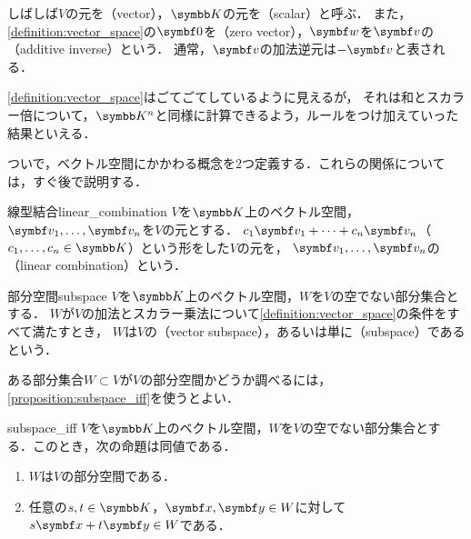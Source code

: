 \documentclass[../../main]{subfiles}
\begin{document}
しばしば\(V\)の元を（vector），\(\numset{K}\)の元を（scalar）と呼ぶ．
また，\cref{definition:vector_space}の\(\zvec\)を（zero vector），\(\vect{w}\)を\(\vect{v}\)の（additive inverse）という．
通常，\(\vect{v}\)の加法逆元は\(-\vect{v}\)と表される．

\begin{note}
  \cref{definition:vector_space}はごてごてしているように見えるが，
  それは和とスカラー倍について，\(\numset{K}^n\)と同様に計算できるよう，ルールをつけ加えていった結果といえる．
\end{note}

ついで，ベクトル空間にかかわる概念を2つ定義する．これらの関係については，すぐ後で説明する．

\begin{definition}{線型結合}{linear_combination}
  \(V\)を\(\numset{K}\)上のベクトル空間，\(\vect{v}_1,\dots,\vect{v}_n\)を\(V\)の元とする．
  \(c_1\vect{v}_1+\dots+c_n\vect{v}_n\)（\(c_1,\dots,c_n\in\numset{K}\)）という形をした\(V\)の元を，
  \(\vect{v}_1,\dots,\vect{v}_n\)の（linear combination）という．
\end{definition}

\begin{definition}{部分空間}{subspace}
  \(V\)を\(\numset{K}\)上のベクトル空間，\(W\)を\(V\)の空でない部分集合とする．
  \(W\)が\(V\)の加法とスカラー乗法について\cref{definition:vector_space}の条件をすべて満たすとき，
  \(W\)は\(V\)の（vector subspace），あるいは単に（subspace）であるという．    
\end{definition}

ある部分集合\(W\subset V\)が\(V\)の部分空間かどうか調べるには，\cref{proposition:subspace_iff}を使うとよい．

\begin{proposition}{}{subspace_iff}
  \(V\)を\(\numset{K}\)上のベクトル空間，\(W\)を\(V\)の空でない部分集合とする．このとき，次の命題は同値である．
  \begin{enumerate}
    \item \(W\)は\(V\)の部分空間である．
    \item 任意の\(s,t\in\numset{K}\)，\(\vect{x},\vect{y}\in W\)に対して\(s\vect{x}+t\vect{y}\in W\)である．
  \end{enumerate}
\end{proposition}
\end{document}
